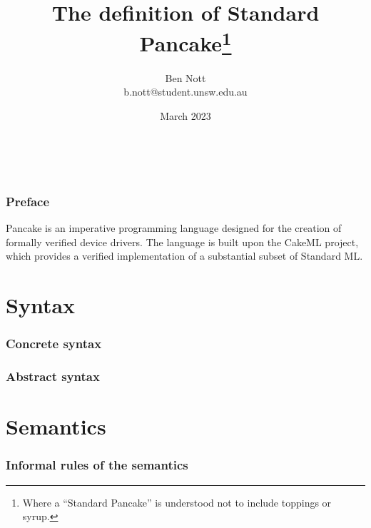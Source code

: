 \documentclass[graybox,envcountsect]{SVMonoEnhanced}
\begin{document}
~
\author{Ben Nott\\ \small b.nott@student.unsw.edu.au}
\title{The definition of Standard Pancake\footnote{Where a ``Standard Pancake'' is understood not to include toppings or syrup.}}
\subtitle{}
\date{March 2023}
\maketitle

\frontmatter

\section*{Preface}
\label{sec:preface}

Pancake is an imperative programming language designed for the creation of formally verified device drivers. The language is built upon the CakeML project, which provides a verified implementation of a substantial subset of Standard ML.

\tableofcontents
\setcounter{secnumdepth}{1}
\setcounter{secnumdepth}{0}

\mainmatter

\part{Syntax}
\label{part:syntax}

\section{Concrete syntax}
\label{sec:concrete-syntax}

\section{Abstract syntax}
\label{sec:abstract-syntax}

\part{Semantics}
\label{part:semantics}

\section{Informal rules of the semantics}
\label{sec:informal-rules}
\end{document}
